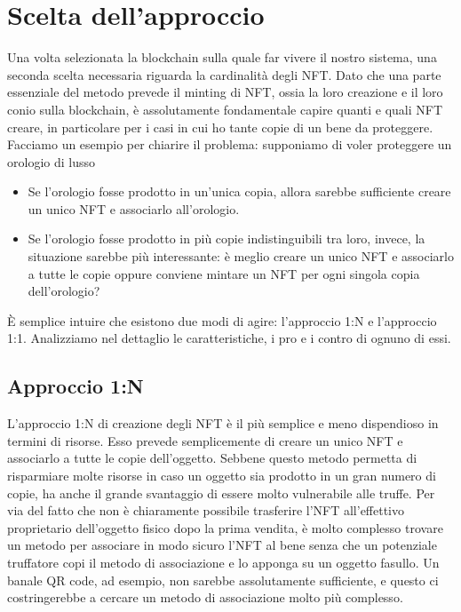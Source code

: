 \documentclass[12pt]{report}
\begin{document}
\chapter{Scelta dell'approccio}
\label{chap:capitolo4}
\noindent
Una volta selezionata la blockchain sulla quale far vivere il nostro sistema, una seconda scelta necessaria riguarda la cardinalità degli NFT. Dato che una parte essenziale del metodo prevede il minting di NFT, ossia la loro creazione e il loro conio sulla blockchain, è assolutamente fondamentale capire quanti e quali NFT creare, in particolare per i casi in cui ho tante copie di un bene da proteggere.\newline
Facciamo un esempio per chiarire il problema: supponiamo di voler proteggere un orologio di lusso
\begin{itemize}[topsep=5pt, itemsep=0pt]
    \item Se l'orologio fosse prodotto in un'unica copia, allora sarebbe sufficiente creare un unico NFT e associarlo all'orologio.
    \item Se l'orologio fosse prodotto in più copie indistinguibili tra loro, invece, la situazione sarebbe più interessante: è meglio creare un unico NFT e associarlo a tutte le copie oppure conviene mintare un NFT per ogni singola copia dell'orologio?
\end{itemize}
È semplice intuire che esistono due modi di agire: l'approccio 1:N e l'approccio 1:1.\newline
Analizziamo nel dettaglio le caratteristiche, i pro e i contro di ognuno di essi.\newpage

\section{Approccio 1:N}
L'approccio 1:N di creazione degli NFT è il più semplice e meno dispendioso in termini di risorse. Esso prevede semplicemente di creare un unico NFT e associarlo a tutte le copie dell'oggetto.\newline
Sebbene questo metodo permetta di risparmiare molte risorse in caso un oggetto sia prodotto in un gran numero di copie, ha anche il grande svantaggio di essere molto vulnerabile alle truffe. Per via del fatto che non è chiaramente possibile trasferire l'NFT all'effettivo proprietario dell'oggetto fisico dopo la prima vendita, è molto complesso trovare un metodo per associare in modo sicuro l'NFT al bene senza che un potenziale truffatore copi il metodo di associazione e lo apponga su un oggetto fasullo. Un banale QR code, ad esempio, non sarebbe assolutamente sufficiente, e questo ci costringerebbe a cercare un metodo di associazione molto più complesso.
\end{document}
